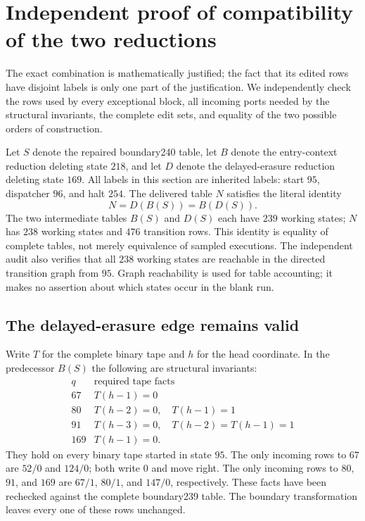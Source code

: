 \section{Independent proof of compatibility of the two reductions}
\label{sec:independent-composition}

The exact combination is mathematically justified; the fact that its
edited rows have disjoint labels is only one part of the justification.
We independently check the rows used by every exceptional block, all
incoming ports needed by the structural invariants, the complete edit
sets, and equality of the two possible orders of construction.

Let $S$ denote the repaired boundary240 table, let $B$ denote the
entry-context reduction deleting state $218$, and let $D$ denote the
delayed-erasure reduction deleting state $169$.  All labels in this
section are inherited labels: start $95$, dispatcher $96$, and halt
$254$.  The delivered table $N$ satisfies the literal identity
\[
             N=D(B(S))=B(D(S)).
\]
The two intermediate tables $B(S)$ and $D(S)$ each have $239$ working
states; $N$ has $238$ working states and $476$ transition rows.
This identity is equality of complete tables, not merely equivalence
of sampled executions.  The independent audit also verifies that
all $238$ working states are reachable in the directed transition
graph from $95$.  Graph reachability is used for table accounting;
it makes no assertion about which states occur in the blank run.

\subsection{The delayed-erasure edge remains valid}

Write $T$ for the complete binary tape and $h$ for the head coordinate.
In the predecessor $B(S)$ the following are structural invariants:
\[
\begin{array}{c|l}
q&\text{required tape facts}\\\hline
67&T(h-1)=0\\
80&T(h-2)=0,\quad T(h-1)=1\\
91&T(h-3)=0,\quad T(h-2)=T(h-1)=1\\
169&T(h-1)=0.
\end{array}
\]
They hold on every binary tape started in state $95$.  The only
incoming rows to $67$ are $52/0$ and $124/0$; both write $0$ and move
right.  The only incoming rows to $80$, $91$, and $169$ are
$67/1$, $80/1$, and $147/0$, respectively.  These facts have been
rechecked against the complete boundary239 table.  The boundary
transformation leaves every one of these rows unchanged.

